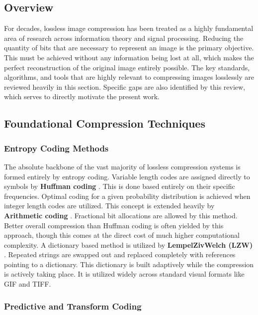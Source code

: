 

\subsection{Overview}

For decades, lossless image compression has been treated as a highly fundamental area of research across information theory and signal processing. Reducing the quantity of bits that are necessary to represent an image is the primary objective. This must be achieved without any information being lost at all, which makes the perfect reconstruction of the original image entirely possible. The key standards, algorithms, and tools that are highly relevant to compressing images losslessly are reviewed heavily in this section. Specific gaps are also identified by this review, which serves to directly motivate the present work.

\subsection{Foundational Compression Techniques}

\subsubsection{Entropy Coding Methods}

The absolute backbone of the vast majority of lossless compression systems is formed entirely by entropy coding. Variable length codes are assigned directly to symbols by \textbf{Huffman coding} \cite{Huffman1952}. This is done based entirely on their specific frequencies. Optimal coding for a given probability distribution is achieved when integer length codes are utilized. This concept is extended heavily by \textbf{Arithmetic coding} \cite{Witten1987}. Fractional bit allocations are allowed by this method. Better overall compression than Huffman coding is often yielded by this approach, though this comes at the direct cost of much higher computational complexity. A dictionary based method is utilized by \textbf{LempelZivWelch (LZW)} \cite{Welch1984}. Repeated strings are swapped out and replaced completely with references pointing to a dictionary. This dictionary is built adaptively while the compression is actively taking place. It is utilized widely across standard visual formats like GIF and TIFF.



\subsubsection{Predictive and Transform Coding}

